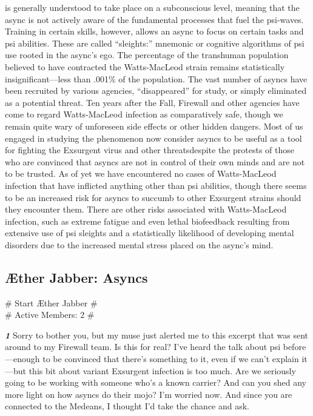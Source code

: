 is generally understood to take place on
a subconscious level, meaning that the
async is not actively aware of the fundamental
processes that fuel the psi-waves.
Training in certain skills, however, allows
an async to focus on certain tasks and
psi abilities. These are called “sleights:”
mnemonic or cognitive algorithms of psi
use rooted in the async’s ego.
The percentage of the transhuman
population believed to have contracted
the Watts-MacLeod strain remains statistically
insignificant—less than .001\%
of the population. The vast number of
asyncs have been recruited by various
agencies, “disappeared” for study, or
simply eliminated as a potential threat.
Ten years after the Fall, Firewall and
other agencies have come to regard
Watts-MacLeod infection as comparatively
safe, though we remain quite
wary of unforeseen side effects or other
hidden dangers. Most of us engaged in
studying the phenomenon now consider
asyncs to be useful as a tool for fighting
the Exsurgent virus and other threatsdespite the protests of those who are
convinced that asyncs are not in control
of their own minds and are not to be
trusted. As of yet we have encountered
no cases of Watts-MacLeod infection
that have inflicted anything other than
psi abilities, though there seems to be
an increased risk for asyncs to succumb
to other Exsurgent strains should they
encounter them. There are other risks associated
with Watts-MacLeod infection,
such as extreme fatigue and even lethal
biofeedback resulting from extensive use
of psi sleights and a statistically likelihood
of developing mental disorders due
to the increased mental stress placed on
the async’s mind.

\newpage
\subsection{Æther Jabber: Asyncs}
\# Start Æther Jabber \# \\
\# Active Members: 2 \#

\textbf{\textit{1}} Sorry to bother you, but my muse just
alerted me to this excerpt that was
sent around to my Firewall team. Is
this for real? I’ve heard the talk about
psi before—enough to be convinced
that there’s something to it, even
if we can’t explain it—but this bit
about variant Exsurgent infection is
too much. Are we seriously going to
be working with someone who’s a
known carrier? And can you shed any
more light on how asyncs do their
mojo? I’m worried now. And since
you are connected to the Medeans, I
thought I’d take the chance and ask.


